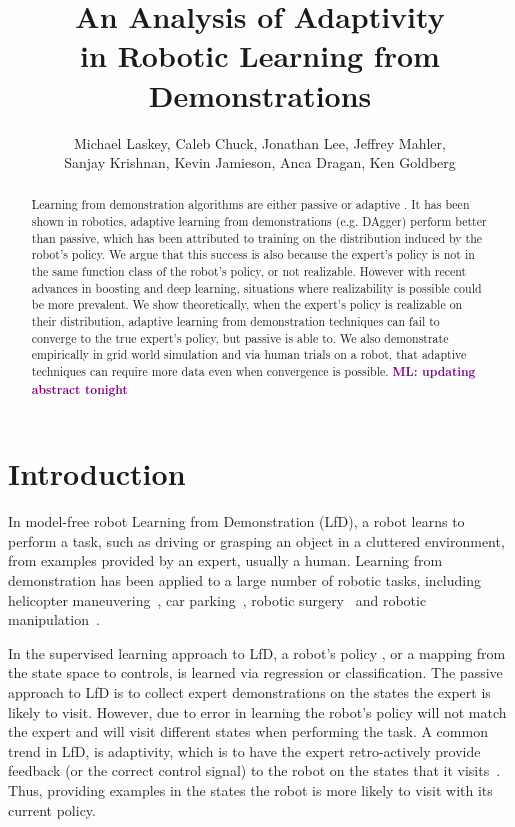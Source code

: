 \documentclass[10pt, conference]{ieeeconf}      %
\title{An Analysis of Adaptivity
 \\in  Robotic Learning from Demonstrations}
\author{Michael Laskey, Caleb Chuck, Jonathan Lee, Jeffrey Mahler,\\ Sanjay Krishnan, Kevin Jamieson, Anca Dragan, Ken Goldberg}
\newcommand{\mlnote}[1]{\ifthenelse{ \boolean{include-notes}}%
 {\textcolor{purple}{\textbf{ML: #1}}}{}}
\begin{document}
\maketitle
\thispagestyle{empty}
\pagestyle{empty}







\begin{abstract}
Learning from demonstration algorithms are either passive or adaptive . It has been shown in robotics, adaptive learning from demonstrations (e.g. DAgger) perform better than passive, which has been attributed to training on the distribution induced by the robot's policy. We argue that this success is also because the expert's policy  is not in the same function class of the robot's policy, or not realizable. However with recent advances in boosting and deep learning, situations where realizability is possible could be more prevalent.  We show theoretically, when the expert's policy is realizable on their distribution, adaptive learning from demonstration techniques can fail to converge to the true expert's policy, but passive is able to. We also demonstrate empirically in grid world simulation  and via human trials on a robot, that adaptive techniques can require more data even when convergence is possible. \mlnote{updating abstract tonight}
 \end{abstract}


\section{Introduction} 
In model-free robot Learning from Demonstration (LfD), a robot learns to perform a task, such as driving or grasping an object in a cluttered environment, from examples provided by an expert, usually a human. Learning from demonstration has been applied to a large number of robotic tasks, including helicopter maneuvering~\cite{abbeel2007application}, car parking~\cite{abbeel2008apprenticeship}, robotic surgery~\cite{van2010superhuman,laskeyshiv} and robotic manipulation~\cite{laskeyrobot}. 

In the supervised learning approach to LfD, a robot's policy , or a mapping from the state space to controls, is learned via regression or classification. The passive approach to LfD is to collect expert demonstrations on the states the expert is likely to visit. However, due to error in learning the robot's policy will not match the expert and will visit different states when performing the task. A common trend in LfD, is adaptivity, which is to have the expert retro-actively provide feedback (or the correct control signal) to the robot on the states that it visits~\cite{ross2010efficient,ross2010reduction,laskeyrobot,laskeyshiv,he2012imitation}.
Thus, providing examples in the states the robot is more likely to visit with its current policy. 
\end{document}
